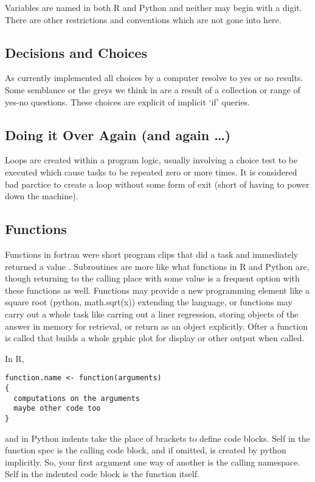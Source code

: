 \documentclass[]{book}
\theoremstyle{definition}
\theoremstyle{definition}
\theoremstyle{definition}
\theoremstyle{remark}
\begin{document}
Variables are named in both R and Python and neither may begin with a
digit. There are other restrictions and conventions which are not gone
into here.

\subsection{Decisions and Choices}\label{decisions-and-choices}

As currently implemented all choices by a computer resolve to yes or no
results. Some semblance or the greys we think in are a result of a
collection or range of yes-no questions. These choices are explicit of
implicit `if' queries.

\subsection{Doing it Over Again (and again
\ldots{})}\label{doing-it-over-again-and-again}

Loops are created within a program logic, usually involving a choice
test to be executed which cause tasks to be repeated zero or more times.
It is considered bad parctice to create a loop without some form of exit
(short of having to power down the machine).

\subsection{Functions}\label{functions}

Functions in fortran were short program clips that did a task and
immediately returned a value . Subroutines are more like what functions
in R and Python are, though returning to the calling place with some
value is a frequent option with these functions as well. Functions may
provide a new programming element like a square root (python,
math.sqrt(x)) extending the language, or functions may carry out a whole
task like carring out a liner regression, storing objects of the answer
in memory for retrieval, or return as an object explicitly. Ofter a
function is called that builds a whole grphic plot for display or other
output when called.

In R,

\begin{verbatim}
function.name <- function(arguments) 
{
  computations on the arguments
  maybe other code too
}
\end{verbatim}

and in Python indents take the place of brackets to define code blocks.
Self in the function spec is the calling code block, and if omitted, is
created by python implicitly. So, your first argument one way of another
is the calling namespace. Self in the indented code block is the
function itself.
\end{document}
